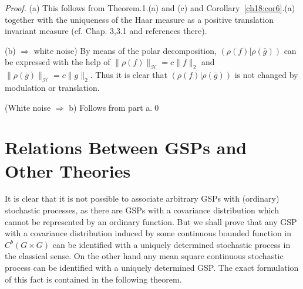 \documentclass[graybox]{svmult}
\begin{document}
\begin{proof}

(a) This follows from  Theorem.1.(a) and (c) and
Corollary~\ref{ch18:cor6}.(a) together with the uniqueness of the Haar measure as a
positive translation invariant measure (cf.  \cite{re68} Chap. 3,3.1 and
references there).

(b) $\Rightarrow $ white noise) By means of the polar decomposition,
$(\rho (f)| \rho (\bar{g}))$ can be expressed with the help of
$\| \rho(f)\| _{\mathcal{H}}=c\| f\| _{2}$
and $\| \rho (\bar{g})\| _{\mathcal{H}} = c\| g\| _{2}$.
Thus it is clear that $(\rho (f)| \rho(\bar{g}))$
is not changed by modulation or translation.

(White noise $\Rightarrow$ b) Follows from part a.\qed
\end{proof}

\section{Relations Between GSPs and Other Theories}
\label{ch18:sec5}

It is clear that it is not possible to associate arbitrary
GSPs with (ordinary) stochastic processes, as there are GSPs with a covariance
distribution which cannot be represented by an ordinary function. But
we shall prove that any GSP with a covariance distribution
induced by some continuous bounded function in $C^{b}(G\times G)$
can be identified with a
uniquely determined stochastic process in the classical sense. On the other
hand any mean square continuous stochastic process can be identified with a
uniquely determined GSP. The exact formulation of this fact is contained in
the following theorem.
\end{document}
